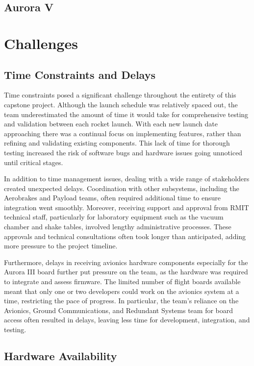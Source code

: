 \subsection{Aurora V}

\section{Challenges}
\subsection{Time Constraints and Delays}
Time constraints posed a significant challenge throughout the entirety of this capstone project. Although the launch schedule was relatively spaced out, the team underestimated the amount of time it would take for comprehensive testing and validation between each rocket launch. With each new launch date approaching there was a continual focus on implementing features, rather than refining and validating existing components. This lack of time for thorough testing increased the risk of software bugs and hardware issues going unnoticed until critical stages.  

In addition to time management issues, dealing with a wide range of stakeholders created unexpected delays. Coordination with other subsystems, including the Aerobrakes and Payload teams, often required additional time to ensure integration went smoothly. Moreover, receiving support and approval from RMIT technical staff, particularly for laboratory equipment such as the vacuum chamber and shake tables, involved lengthy administrative processes. These approvals and technical consultations often took longer than anticipated, adding more pressure to the project timeline. 

Furthermore, delays in receiving avionics hardware components especially for the Aurora III board further put pressure on the team, as the hardware was required to integrate and assess firmware. The limited number of flight boards available meant that only one or two developers could work on the avionics system at a time, restricting the pace of progress. In particular, the team’s reliance on the Avionics, Ground Communications, and Redundant Systems team for board access often resulted in delays, leaving less time for development, integration, and testing.  

\subsection{Hardware Availability}
